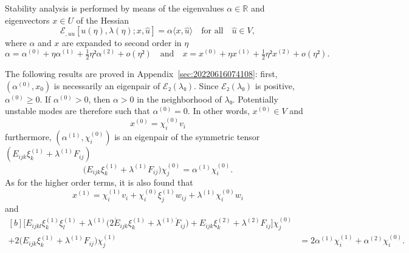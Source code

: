 \documentclass[12pt, final]{scrartcl}
\theoremstyle{definition}
\newcommand{\E}{\mathcal E}
\newcommand{\order}[2][1]{#2^{(#1)}}
\newcommand{\reals}{\mathbb{R}}
\begin{document}
Stability analysis is performed by means of the eigenvalues $α ∈ \reals$ and
eigenvectors $x ∈ U$ of the Hessian
\begin{equation}
  \label{eq:20220617074949}
  \E_{, u u} [u(η), \lambda(η); x, \hat{u}] = α 〈 x, \hat{u} 〉 \quad \text{for all} \quad \hat{u} ∈ V,
\end{equation}
where $α$ and $x$ are expanded to second order in $η$
\begin{equation}
  \label{eq:20220617064633}
  α = \order[0]α + η \order[1]α + \tfrac{1}{2} η² \order[2]α + o(η²)
  \quad \text{and} \quad
  x = \order[0]x + η \order[1]x + \tfrac{1}{2} η² \order[2]x + o(η²).
\end{equation}

The following results are proved in Appendix~\ref{sec:20220616074108}: first,
$(\order[0]α, x_0)$ is necessarily an eigenpair of $\E₂(\lambda₀)$. Since $\E₂ (\lambda₀)$ is
positive, $\order[0]α ≥ 0$. If $\order[0]α>0$, then $α>0$ in the neighborhood of
$\lambda₀$. Potentially unstable modes are therefore such that $\order[0]α=0$. In other
words, $\order[0]x ∈ V$ and
\begin{equation}
  \label{eq:20220904160057}
  \order[0]x = \order[0]{χ_i} v_i
\end{equation}
furthermore, $(\order[1]α, \order[0]{χ_i})$ is an eigenpair of the symmetric
tensor $(E_{ijk} \order[1]{ξ_k} + \order[1]\lambda F_{ij})$
\begin{equation}
  \label{eq:20220609133608}
  \bigl(E_{ijk} \order[1]{ξ_k} + \order[1]\lambda F_{ij} \bigr) \order[0]{χ_j} = \order[1]α \order[0]{χ_i}.
\end{equation}
As for the higher order terms, it is also found that
\begin{equation}
  \label{eq:20220609133629}
  \order[1]x = \order[1]{χ_i} v_i +  \order[0]{χ_i} \order[1]{ξ_j} w_{i j} + \order[1]\lambda \order[0]{χ_i} w_i
\end{equation}
and
\begin{equation}
  \label{eq:20220616082923}
  \begin{aligned}[b]
    \bigl[E_{ijkl} \order[1]{ξ_k} \order[1]{ξ_l} + \order[1]\lambda\bigl(2 \mathring{E}_{ijk} \order[1]{ξ_k} + \order[1]\lambda \mathring{F}_{ij}\bigr) + E_{ijk} \order[2]{ξ_k}
    + \order[2]\lambda F_{ij} \bigr] \order[0]{χ_j} &\\
    + 2\bigl(E_{ijk}  \order[1]{ξ_k} + \order[1]\lambda F_{ij} \bigr) \order[1]{χ_j}
    & = 2\order[1]α\order[1]{χ_i} + \order[2]α \order[0]{χ_i}.
  \end{aligned}
\end{equation}
\end{document}
